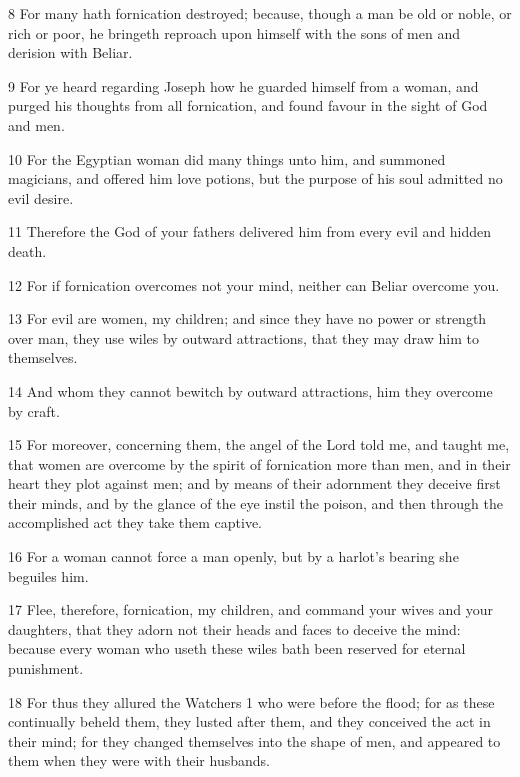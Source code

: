 \par 8 For many hath fornication destroyed; because, though a man be old or noble, or rich or poor, he bringeth reproach upon himself with the sons of men and derision with Beliar.

\par 9 For ye heard regarding Joseph how he guarded himself from a woman, and purged his thoughts from all fornication, and found favour in the sight of God and men.

\par 10 For the Egyptian woman did many things unto him, and summoned magicians, and offered him love potions, but the purpose of his soul admitted no evil desire.

\par 11 Therefore the God of your fathers delivered him from every evil and hidden death.

\par 12 For if fornication overcomes not your mind, neither can Beliar overcome you.

\par 13 For evil are women, my children; and since they have no power or strength over man, they use wiles by outward attractions, that they may draw him to themselves.

\par 14 And whom they cannot bewitch by outward attractions, him they overcome by craft.

\par 15 For moreover, concerning them, the angel of the Lord told me, and taught me, that women are overcome by the spirit of fornication more than men, and in their heart they plot against men; and by means of their adornment they deceive first their minds, and by the glance of the eye instil the poison, and then through the accomplished act they take them captive.

\par 16 For a woman cannot force a man openly, but by a harlot's bearing she beguiles him.

\par 17 Flee, therefore, fornication, my children, and command your wives and your daughters, that they adorn not their heads and faces to deceive the mind: because every woman who useth these wiles bath been reserved for eternal punishment.

\par 18 For thus they allured the Watchers 1 who were before the flood; for as these continually beheld them, they lusted after them, and they conceived the act in their mind; for they changed themselves into the shape of men, and appeared to them when they were with their husbands.

